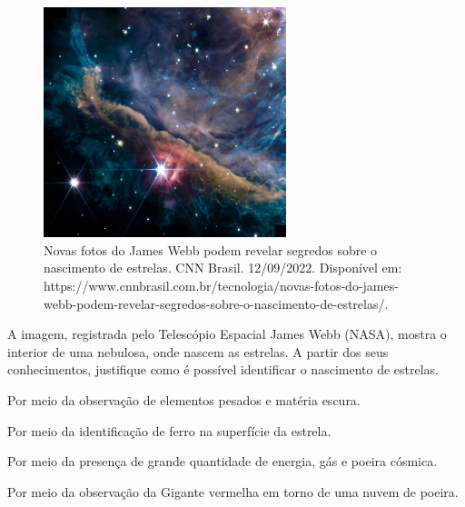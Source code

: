 \begin{figure}[htpb!]
\includegraphics[width=2.77865in,height=2.63750in]{./imgs/img13.jpg}
\caption{Novas fotos do James Webb podem revelar segredos sobre o nascimento de estrelas. CNN Brasil. 12/09/2022. Disponível em: https://www.cnnbrasil.com.br/tecnologia/novas-fotos-do-james-webb-podem-revelar-segredos-sobre-o-nascimento-de-estrelas/.}
\end{figure}

A imagem, registrada pelo Telescópio Espacial James Webb (NASA), mostra o
interior de uma nebulosa, onde nascem as estrelas. A partir dos seus
conhecimentos, justifique como é possível identificar o nascimento de
estrelas.

\begin{escolha}
\item
  Por meio da observação de elementos pesados e matéria escura.
\item
  Por meio da identificação de ferro na superfície da estrela.
\item
  Por meio da presença de grande quantidade de energia, gás e poeira cósmica.
\item
 Por meio da observação da Gigante vermelha em torno de uma nuvem de poeira.
\end{escolha}


